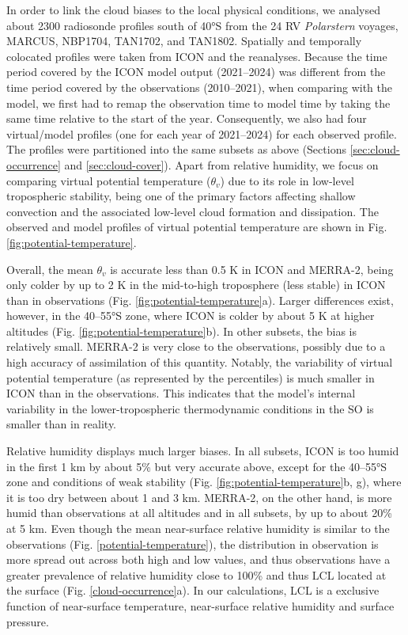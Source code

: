 \documentclass[12pt,a4paper]{article}
\begin{document}
In order to link the cloud biases to the local physical conditions, we analysed
about 2300 radiosonde profiles south of 40°S from the 24 RV \emph{Polarstern}
voyages, MARCUS, NBP1704, TAN1702, and TAN1802. Spatially and temporally
colocated profiles were taken from ICON and the reanalyses.  Because the time
period covered by the ICON model output (2021--2024) was different from the
time period covered by the observations (2010--2021), when comparing with the
model, we first had to remap the observation time to model time by taking the
same time relative to the start of the year. Consequently, we also had four
virtual/model profiles (one for each year of 2021--2024) for each observed
profile.  The profiles were partitioned into the same subsets as above
(Sections \ref{sec:cloud-occurrence} and \ref{sec:cloud-cover}).  Apart from
relative humidity, we focus on comparing virtual potential temperature
($\theta_v$) due to its role in low-level tropospheric stability, being one of
the primary factors affecting shallow convection and the associated low-level
cloud formation and dissipation. The observed and model profiles of virtual
potential temperature are shown in Fig. \ref{fig:potential-temperature}.

Overall, the mean $\theta_v$ is accurate less than 0.5 K in ICON and MERRA-2,
being only colder by up to 2 K in the mid-to-high troposphere (less stable) in
ICON than in observations (Fig. \ref{fig:potential-temperature}a).  Larger
differences exist, however, in the 40--55°S zone, where ICON is colder by about
5 K at higher altitudes (Fig.  \ref{fig:potential-temperature}b). In other
subsets, the bias is relatively small. MERRA-2 is very close to the
observations, possibly due to a high accuracy of assimilation of this quantity.
Notably, the variability of virtual potential temperature (as represented by
the percentiles) is much smaller in ICON than in the observations. This
indicates that the model's internal variability in the lower-tropospheric
thermodynamic conditions in the SO is smaller than in reality.

Relative humidity displays much larger biases. In all subsets, ICON is too
humid in the first 1 km by about 5\% but very accurate above, except for the
40--55°S zone and conditions of weak stability (Fig.
\ref{fig:potential-temperature}b, g),  where it is too dry between about 1 and
3 km. MERRA-2, on the other hand, is more humid than observations at all
altitudes and in all subsets, by up to about 20\% at 5 km. Even though the mean
near-surface relative humidity is similar to the observations (Fig.
\ref{potential-temperature}), the distribution in observation is more spread
out across both high and low values, and thus observations have a greater
prevalence of relative humidity close to 100\% and thus LCL located at the
surface (Fig. \ref{cloud-occurrence}a). In our calculations, LCL is a exclusive
function of near-surface temperature, near-surface relative humidity and
surface pressure.
\end{document}
